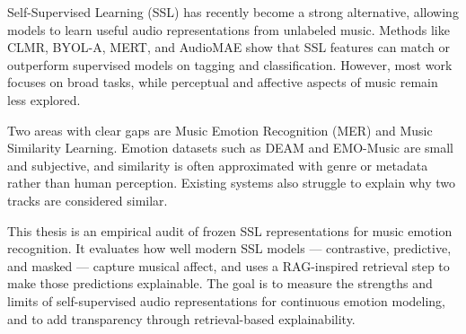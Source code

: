 \documentclass[12pt]{report}
\begin{document}
Self-Supervised Learning (SSL) has recently become a strong alternative, allowing models to learn useful audio representations from unlabeled music. Methods like CLMR, BYOL-A, MERT, and AudioMAE show that SSL features can match or outperform supervised models on tagging and classification. However, most work focuses on broad tasks, while perceptual and affective aspects of music remain less explored.

Two areas with clear gaps are Music Emotion Recognition (MER) and Music Similarity Learning. Emotion datasets such as DEAM and EMO-Music are small and subjective, and similarity is often approximated with genre or metadata rather than human perception. Existing systems also struggle to explain why two tracks are considered similar.

This thesis is an empirical audit of frozen SSL representations for music emotion recognition. It evaluates how well modern SSL models --- contrastive, predictive, and masked --- capture musical affect, and uses a RAG-inspired retrieval step to make those predictions explainable. The goal is to measure the strengths and limits of self-supervised audio representations for continuous emotion modeling, and to add transparency through retrieval-based explainability.
\end{document}
